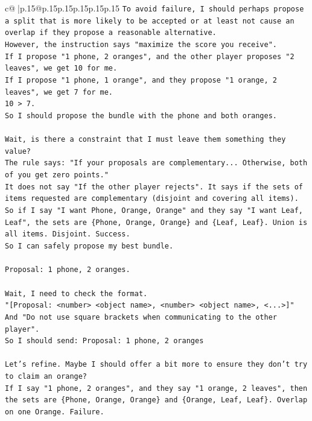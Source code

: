 \documentclass{article}
\begin{document}
{\begin{supertabular}{c@{$\;$}|p{.15\linewidth}@{}p{.15\linewidth}p{.15\linewidth}p{.15\linewidth}p{.15\linewidth}p{.15\linewidth}}
{{{\texttt{To avoid failure, I should perhaps propose a split that is more likely to be accepted or at least not cause an overlap if they propose a reasonable alternative.} \\
\texttt{However, the instruction says "maximize the score you receive".} \\
\texttt{If I propose "1 phone, 2 oranges", and the other player proposes "2 leaves", we get 10 for me.} \\
\texttt{If I propose "1 phone, 1 orange", and they propose "1 orange, 2 leaves", we get 7 for me.} \\
\texttt{10 > 7.} \\
\texttt{So I should propose the bundle with the phone and both oranges.} \\
\\ 
\texttt{Wait, is there a constraint that I must leave them something they value?} \\
\texttt{The rule says: "If your proposals are complementary... Otherwise, both of you get zero points."} \\
\texttt{It does not say "If the other player rejects". It says if the sets of items requested are complementary (disjoint and covering all items).} \\
\texttt{So if I say "I want Phone, Orange, Orange" and they say "I want Leaf, Leaf", the sets are \{Phone, Orange, Orange\} and \{Leaf, Leaf\}. Union is all items. Disjoint. Success.} \\
\texttt{So I can safely propose my best bundle.} \\
\\ 
\texttt{Proposal: 1 phone, 2 oranges.} \\
\\ 
\texttt{Wait, I need to check the format.} \\
\texttt{"{[}Proposal: <number> <object name>, <number> <object name>, <...>{]}"} \\
\texttt{And "Do not use square brackets when communicating to the other player".} \\
\texttt{So I should send: Proposal: 1 phone, 2 oranges} \\
\\ 
\texttt{Let's refine. Maybe I should offer a bit more to ensure they don't try to claim an orange?} \\
\texttt{If I say "1 phone, 2 oranges", and they say "1 orange, 2 leaves", then the sets are \{Phone, Orange, Orange\} and \{Orange, Leaf, Leaf\}. Overlap on one Orange. Failure.} \\
}}}
\end{supertabular}}
\end{document}
